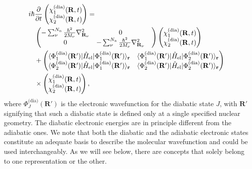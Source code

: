 \documentclass[9pt,bestpractices]{livecoms}
\newcommand{\bs}{\mathbf}
\begin{document}
\begin{align} 
 i\hbar & \frac{\partial}{\partial t} 
     \begin{pmatrix}
        \chi_1^{\text{(dia)}}(\mathbf{R},t)  \\
        \chi_2^{\text{(dia)}}(\mathbf{R},t) \\
    \end{pmatrix} =  \notag \\
   & \begin{pmatrix}
        -\sum_\nu^{N_{\text{n}}}\frac{\hbar^2}{2M_\nu} \nabla_{\mathbf{R}_\nu}^2   & 0 \\
        0  & -\sum_\nu^{N_{\text{n}}}\frac{\hbar^2}{2M_\nu} \nabla_{\mathbf{R}_\nu}^2  & \\
    \end{pmatrix} 
    \begin{pmatrix}
        \chi_1^{\text{(dia)}}(\mathbf{R},t)  \\
        \chi_2^{\text{(dia)}}(\mathbf{R},t) \\
    \end{pmatrix}
    \notag \\
    &  + 
    \begin{pmatrix}
        \langle \Phi_1^{\text{(dia)}}(\bs R')  | \hat{H}_{\text{el}} | \Phi_1^{\text{(dia)}}(\bs R')  \rangle_{\bs r}    & \langle \Phi_1^{\text{(dia)}}(\bs R')  | \hat{H}_{\text{el}} | \Phi_2^{\text{(dia)}}(\bs R')  \rangle_{\bs r}   \\
        \langle \Phi_2^{\text{(dia)}}(\bs R')  | \hat{H}_{\text{el}} | \Phi_1^{\text{(dia)}}(\bs R')  \rangle_{\bs r}  & \langle \Phi_2^{\text{(dia)}}(\bs R')  | \hat{H}_{\text{el}} | \Phi_2^{\text{(dia)}}(\bs R')  \rangle_{\bs r}    \\
    \end{pmatrix} \notag \\
    & \times \begin{pmatrix}
        \chi_1^{\text{(dia)}}(\mathbf{R},t)  \\
        \chi_2^{\text{(dia)}}(\mathbf{R},t) \\
    \end{pmatrix}
   ,
\label{eq:matrixtdse2statesdiab}
\end{align}
\noindent where $\Phi_J^{\text{(dia)}}(\bs R')$ is the electronic wavefunction for the diabatic state $J$, with $\bs R'$ signifying that such a diabatic state is defined only at a single specified nuclear geometry. The diabatic electronic energies are in principle different from the adiabatic ones. We note that both the diabatic and the adiabatic electronic states constitute an adequate basis to describe the molecular wavefunction and could be used interchangeably. As we will see below, there are concepts that solely belong to one representation or the other. 
\end{document}
